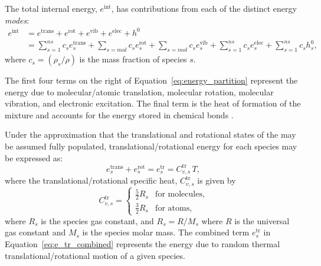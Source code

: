 \documentclass[10pt]{article}
\begin{document}
The total internal energy, $e^{\text{int}}$, has contributions from each of the distinct energy \emph{modes}:%
\begin{equation}
 \begin{split}
e^{\text{int}} &= e^{\text{trans}} + e^{\text{rot}} + e^{\text{vib}} + e^{\text{elec}} + h^0 \\
 &= \sum_{s=1}^{ns} c_s e^{\text{trans}}_s + \sum_{s=mol} c_s e^{\text{rot}}_s + \sum_{s=mol} c_s e^{\text{vib}}_s + \sum_{s=1}^{ns} c_s e^{\text{elec}}_s + \sum_{s=1}^{ns} c_s h^0_s ,
\label{eq:energy_partition}  
 \end{split}
\end{equation}
where $c_s=\left(\rho_s/\rho\right)$ is the mass fraction of species $s$.

The first four terms on the right of Equation~\eqref{eq:energy_partition} represent the energy due to molecular/atomic translation, molecular rotation, molecular vibration, and electronic excitation. The final term is the heat of formation of the mixture and accounts for the energy stored in chemical bonds \citep{Ait1996,Kirk2009}.

Under the approximation that the translational and rotational states of the may be assumed fully populated, translational/rotational energy for each species may be expressed as:
\begin{equation}
 \label{eq:e_tr_combined}
 e^{\text{trans}}_s + e^{\text{rot}}_s = e^{\text{tr}}_s = C^{\text{tr}}_{v,s}\, T ,
\end{equation}
where the translational/rotational specific heat, $C^{\text{tr}}_{v,s}$ is given by
\begin{equation*}
 C^{\text{tr}}_{v,s} =
 \begin{cases}
 \frac{5}{2} R_s & \text{for molecules}, \\
 \frac{3}{2} R_s & \text{for atoms},
 \end{cases}
\end{equation*}
where $R_s$ is the species gas constant, and $R_s = R/M_s$ where $R$ is the universal gas constant and $M_s$ is the species molar mass. The combined term $e^{\text{tr}}_s$ in Equation~\eqref{eq:e_tr_combined} represents the energy due to random thermal translational/rotational motion of a given species.
\end{document}
